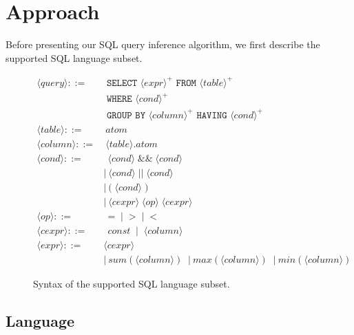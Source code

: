 
\section{Approach}
\label{sec:approach}

Before presenting our SQL query inference algorithm, we first describe
the supported SQL language subset.

\newcommand{\q}{\langle query\rangle}
\newcommand{\db}{\langle db\rangle}
\newcommand{\pat}{\langle pat\rangle}
\newcommand{\bug}{\langle bug\rangle}
\newcommand{\dist}{\langle distance\rangle}
\newcommand{\sem}[1]{\llbracket #1\rrbracket}
\newcommand{\lit}[1]{\texttt{#1}}

\newcommand{\column}{\langle column\rangle}
\newcommand{\dbtable}{\langle table\rangle}
\newcommand{\cond}{\langle cond\rangle}
\newcommand{\op}{\langle op\rangle}
\newcommand{\e}{\langle expr\rangle}
\newcommand{\ce}{\langle cexpr\rangle}

\begin{figure}[t]
\footnotesize%
\begin{align*}
\q ::= {} 
	& \texttt{ SELECT } \e^+ \texttt{ FROM } \dbtable^+ \\
        & \texttt{ WHERE } \cond^+ \\ 
	&  \texttt{ GROUP BY } \column^+ \texttt{ HAVING } \cond^+\\
\dbtable::= {} &\ atom \\
\column ::= {} &\ \dbtable.atom\\
\cond ::= {} &\ \ \cond \;\texttt{\&\&}\; \cond \\ 
    & |\ \cond \;\texttt{||}\; \cond \\
    & |\ \texttt{(}\;\cond\;\texttt{)} \\
    & |\ \ce \;\op\; \ce \\
\op ::= {} &\ \ \texttt{=} \;\;|\;\; \texttt{>}  \;\;|\;\; \texttt{<}\\
\ce ::= {} &\ \ const \;\;|\;\; \column  \;\; \\
\e ::= {} & \ce \\
    & |\ sum(\column) \;\;|\ max(\column) \;\;|\ min(\column) 
\end{align*}
\normalsize%
\caption{Syntax of the supported SQL language subset.}
\label{fig:syntax}
\end{figure}


\subsection{Language}

